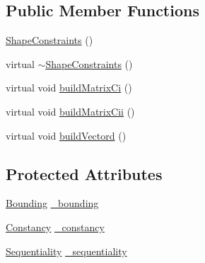 \subsection*{\-Public \-Member \-Functions}
\begin{DoxyCompactItemize}
\item 
\hyperlink{classShapeConstraints_a64f2900bc242720b52f6546e44858e33}{\-Shape\-Constraints} ()
\item 
virtual \hyperlink{classShapeConstraints_a4da7b352ebe70cdfb8a6bcecbe6986ec}{$\sim$\-Shape\-Constraints} ()
\item 
virtual void \hyperlink{classShapeConstraints_a5106b5a5d1b55e1751423f2af1102c4e}{build\-Matrix\-Ci} ()
\item 
virtual void \hyperlink{classShapeConstraints_a22fcfce709900f384603a759729bdbcd}{build\-Matrix\-Cii} ()
\item 
virtual void \hyperlink{classShapeConstraints_ad7fa37ff0da8688ec2f51add0731a232}{build\-Vectord} ()
\end{DoxyCompactItemize}
\subsection*{\-Protected \-Attributes}
\begin{DoxyCompactItemize}
\item 
\hyperlink{classBounding}{\-Bounding} \hyperlink{classShapeConstraints_aec4139d7b2b7af78543227873fcc9b6c}{\-\_\-bounding}
\item 
\hyperlink{classConstancy}{\-Constancy} \hyperlink{classShapeConstraints_a1682a6b89b7c6c058ccb183b689862a3}{\-\_\-constancy}
\item 
\hyperlink{classSequentiality}{\-Sequentiality} \hyperlink{classShapeConstraints_a0a503cf10835b98ddaa4031a7c63ef42}{\-\_\-sequentiality}
\end{DoxyCompactItemize}


